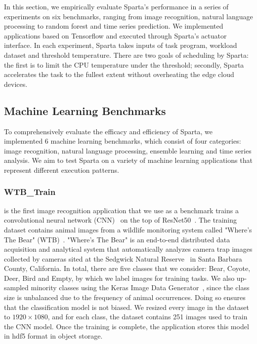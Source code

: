 In this section, we empirically evaluate Sparta's performance in a series of experiments on six benchmarks, ranging from image recognition, natural language processing to random forest and time series prediction. We implemented applications based on Tensorflow and executed through Sparta's actuator interface.  In each experiment, Sparta takes inputs of task program, workload dataset and threshold temperature. There are two goals of scheduling by Sparta: the first is to limit the CPU temperature under the threshold; secondly, Sparta accelerates the task to the fullest extent without overheating the edge cloud devices.

\subsection{Machine Learning Benchmarks}

To comprehensively evaluate the efficacy and efficiency of Sparta, we implemented 6 machine learning benchmarks, which consist of four categories: image recognition, natural language processing, ensemble learning and time series analysis. We aim to test Sparta on a variety of machine learning applications that represent different execution patterns.

\subsubsection{WTB\_Train}

is the first image recognition application that we use as a benchmark trains a convolutional neural network (CNN)~\cite{ref:cnn} on the top of ResNet50~\cite{ref:resnet}. The training dataset contains animal images from a wildlife monitoring system called "Where's The Bear" (WTB)~\cite{ref:wtb}. "Where's The Bear" is an end-to-end distributed data acquisition and analytical system that automatically analyzes camera trap images collected by cameras sited at the Sedgwick Natural Reserve~\cite{ref:sedgwick} in Santa Barbara County, California. In total, there are five classes that we consider: Bear, Coyote, Deer, Bird and Empty, by which we label images for training tasks. We also up-sampled minority classes using the Keras Image Data Generator~\cite{ref:datagen}, since the class size is unbalanced due to the frequency of animal occurrences. Doing so ensures that the classification model is not biased. We resized every image in the dataset to $1920 \times 1080$, and for each class, the dataset contains 251 images used to train the CNN model. Once the training is complete, the application stores this model in hdf5 format in object storage. 

